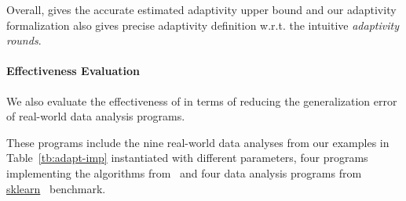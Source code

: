 Overall, {\THESYSTEM} gives the accurate estimated
adaptivity upper bound and our adaptivity formalization also gives precise adaptivity definition w.r.t. the intuitive \emph{adaptivity rounds}.


\paragraph{Effectiveness Evaluation}

We also evaluate the effectiveness of {\THESYSTEM} in terms of reducing the generalization error of real-world data analysis programs.

These programs include 
the nine real-world data analyses from our examples in Table~\ref{tb:adapt-imp} instantiated with different parameters,
four programs implementing the algorithms from~\cite{Jamieson2015TheAO}
and four data analysis programs 
from \hyperlink{https://github.com/scikit-learn/scikit-learn/tree/main/examples}{sklearn}~\cite{SklearnBenchmark} benchmark.

